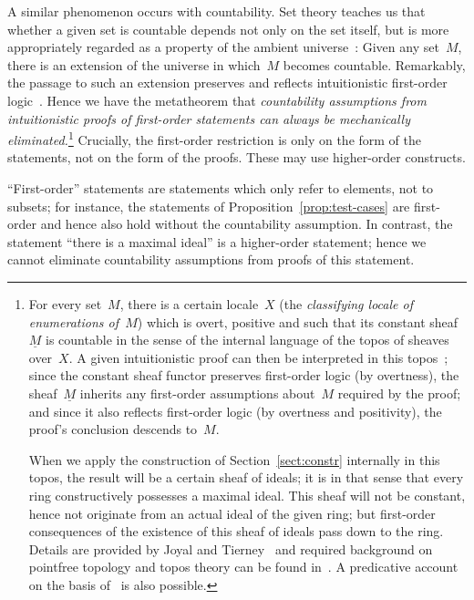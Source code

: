 \documentclass[envcountsect,envcountsame,runningheads]{llncs}
\renewcommand{\_}{\mathpunct{.}\,}
\begin{document}
A similar phenomenon occurs with countability. Set theory teaches us that
whether a given set is countable depends not only on the set itself, but is
more appropriately regarded as a property of the ambient universe~\cite{hamkins:multiverse}: Given any
set~$M$, there is an extension of the universe in which~$M$ becomes countable.
Remarkably, the passage to such an extension preserves and reflects
intuitionistic first-order logic~\cite[pp.~36f.]{joyal-tierney:grothendieck}.
Hence we have the metatheorem that \emph{countability assumptions from
intuitionistic proofs of first-order statements can always be mechanically
eliminated.}\footnote{For every set~$M$, there is a certain locale~$X$ (the
\emph{classifying locale of enumerations of~$M$}) which is overt, positive and such
that its constant sheaf~$\underline{M}$ is countable in the sense of the
internal language of the topos of sheaves over~$X$. A given
intuitionistic proof can then be interpreted in this topos~\cite{caramello:preliminaries,maietti:modular,shulman:categorical-logic}; since the constant
sheaf functor preserves first-order logic (by overtness), the
sheaf~$\underline{M}$ inherits any first-order assumptions about~$M$ required
by the proof; and since it also reflects first-order logic (by overtness and
positivity), the proof's conclusion descends to~$M$.\par When we apply the
construction of Section~\ref{sect:constr} internally in this topos, the result
will be a certain sheaf of ideals; it is in that sense that every ring
constructively possesses a maximal ideal. This sheaf will not be constant,
hence not originate from an actual ideal of the given ring; but first-order
consequences of the existence of this sheaf of ideals pass down to the ring.
Details are provided by Joyal and
Tierney~\cite[pp.~36f.]{joyal-tierney:grothendieck} and required background on
pointfree topology and topos theory can be found
in~\cite{blechschmidt:generalized-spaces,johnstone:point,vickers:continuity,vickers:locales-toposes,belanger-marquis:pointless,johnstone:baby-elephant}. A predicative account on the basis of~\cite{maietti:au,vickers:sketches,crosilla:predicativity}
is also possible.} Crucially, the first-order restriction is only on the form
of the statements, not on the form of the proofs. These may use higher-order constructs.

``First-order'' statements are statements which only refer to elements, not to
subsets; for instance, the statements of Proposition~\ref{prop:test-cases} are
first-order and hence also hold without the countability assumption.
In contrast, the statement ``there is a maximal ideal'' is a higher-order
statement; hence we cannot eliminate countability assumptions from proofs of
this statement.
\end{document}
